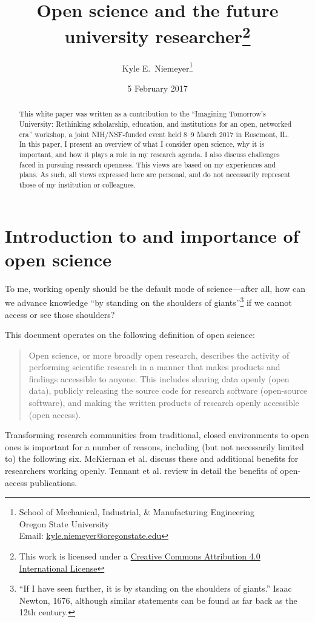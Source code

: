 \documentclass[nobib]{tufte-handout}
\title{Open science and the future university researcher\thanks{This
work is licensed under a
\href{https://creativecommons.org/licenses/by/4.0/}{Creative Commons Attribution
4.0 International License} \ccby}}
\author[Kyle E.~Niemeyer]{Kyle E.~Niemeyer\thanks{
School of Mechanical, Industrial, \& Manufacturing Engineering\\
\noindent Oregon State University\\
\noindent Email: \href{mailto:kyle.niemeyer@oregonstate.edu}{kyle.niemeyer@oregonstate.edu}
}}
\date{5 February 2017} %
\begin{document}
\maketitle%

\begin{abstract}
\noindent
This white paper was written as a contribution to the ``Imagining Tomorrow's University:
Rethinking scholarship, education, and institutions for an open, networked era''
workshop, a joint NIH\slash NSF-funded event held 8--9 March 2017 in Rosemont, IL.
In this paper, I present an overview of what I consider open science,
why it is important, and how it plays a role in my research agenda.
I also discuss challenges faced in pursuing research openness.
This views are based on my experiences and plans. As such, all views expressed
here are personal, and do not necessarily represent those
of my institution or colleagues.
\end{abstract}

\section{Introduction to and importance of open science}
\label{sec:intro}

To me, working openly should be the default mode of science---after all, how can
we advance knowledge ``by standing on the shoulders of giants''\footnote{``If I
have seen further, it is by standing on the shoulders of giants.'' Isaac
Newton, 1676, although similar statements can be found as far back as the 12th
century.} if we cannot access or see those shoulders?

This document operates on the following definition of open science:
\begin{quote}
Open science, or more broadly open research, describes the activity of performing
scientific research in a manner that makes products and findings accessible to
anyone. This includes sharing data openly (open data), publicly releasing the
source code for research software (open-source software), and making the written
products of research openly accessible (open access).
\end{quote}

Transforming research communities from traditional, closed environments to open
ones is important for a number of reasons, including (but not necessarily limited
to) the following six. McKiernan et al.\autocite{McKiernan:2016iz} discuss these
and additional benefits for researchers working openly. Tennant et al.\autocite{Tennant:2016bi}
review in detail the benefits of open-access publications.
\end{document}
